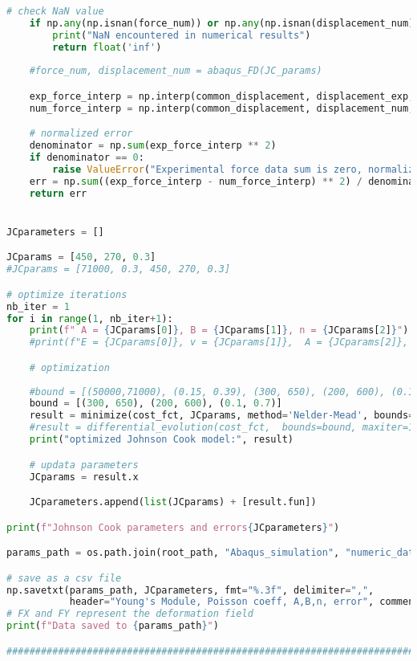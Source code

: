 \documentclass[12pt,a4paper]{article}
\begin{document}
\begin{lstlisting}[language=Python, caption={Optimisation force-déplacement}]
    # check NaN value
    if np.any(np.isnan(force_num)) or np.any(np.isnan(displacement_num)):
        print("NaN encountered in numerical results")
        return float('inf')
    
    #force_num, displacement_num = abaqus_FD(JC_params)

    exp_force_interp = np.interp(common_displacement, displacement_exp, force_exp)
    num_force_interp = np.interp(common_displacement, displacement_num, force_num) 

    # normalized error 
    denominator = np.sum(exp_force_interp ** 2)
    if denominator == 0:
        raise ValueError("Experimental force data sum is zero, normalization is invalid.")
    err = np.sum((exp_force_interp - num_force_interp) ** 2) / denominator
    return err 


JCparameters = []

JCparams = [450, 270, 0.3]
#JCparams = [71000, 0.3, 450, 270, 0.3]

# optimize iterations
nb_iter = 1
for i in range(1, nb_iter+1):
    print(f" A = {JCparams[0]}, B = {JCparams[1]}, n = {JCparams[2]}")
    #print(f"E = {JCparams[0]}, v = {JCparams[1]},  A = {JCparams[2]}, B = {JCparams[3]}, n = {JCparams[4]}")

    # optimization
    
    #bound = [(50000,71000), (0.15, 0.39), (300, 650), (200, 600), (0.1, 0.7)]
    bound = [(300, 650), (200, 600), (0.1, 0.7)]
    result = minimize(cost_fct, JCparams, method='Nelder-Mead', bounds=bound, options={'maxiter': 1})#, 'disp': True})
    #result = differential_evolution(cost_fct,  bounds=bound, maxiter=1)
    print("optimized Johnson Cook model:", result) 

    # updata parameters
    JCparams = result.x

    JCparameters.append(list(JCparams) + [result.fun])

print(f"Johnson Cook parameters and errors{JCparameters}")

params_path = os.path.join(root_path, "Abaqus_simulation", "numeric_data", "JC_parameters.csv")

# save as a csv file
np.savetxt(params_path, JCparameters, fmt="%.3f", delimiter=",", 
           header="Young's Module, Poisson coeff, A,B,n, error", comments="")
# FX and FY represent the deformation field
print(f"Data saved to {params_path}")

###############################################################################################


\end{lstlisting}
\end{document}
